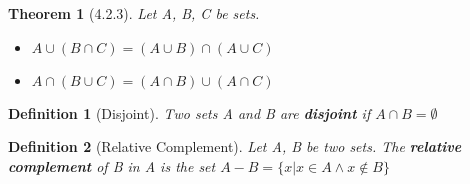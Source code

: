 \documentclass[12pt, letterpaper]{article}
\theoremstyle{plain}
\newtheorem*{theorem*}{Theorem}
\newtheorem*{definition*}{Definition}
\begin{document}
\begin{mdframed}[leftmargin=0.25cm, rightmargin=0.25cm]
        \begin{theorem*}[4.2.3]
            Let A, B, C be sets.
            \begin{itemize}
                \item[(i)] $A \cup (B \cap C) = (A \cup B) \cap (A \cup C)$
                \item[(ii)] $A \cap (B \cup C) = (A \cap B) \cup (A \cap C)$
            \end{itemize}
        \end{theorem*}
        \begin{definition*}[Disjoint]
            Two sets A and B are \textbf{disjoint} if $A \cap B = \emptyset$
        \end{definition*}
        \begin{definition*}[Relative Complement]
            Let A, B be two sets. The \textbf{relative complement} of B in A is the set $A - B = \{x | x \in A \wedge x \notin B \}$
        \end{definition*}
    \end{mdframed}
    \newpage
\end{document}
